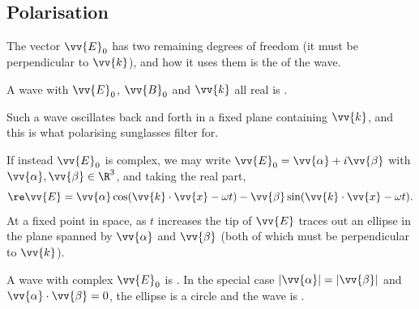 \subsection{Polarisation}

The vector $\vv{E}_0$ has two remaining degrees of freedom (it must be perpendicular to $\vv{k}$), and how it uses them is the  of the wave.

\begin{definition}
	A wave with $\vv{E}_0$, $\vv{B}_0$ and $\vv{k}$ all real is .
\end{definition}

Such a wave oscillates back and forth in a fixed plane containing $\vv{k}$, and this is what polarising sunglasses filter for.

If instead $\vv{E}_0$ is complex, we may write $\vv{E}_0 = \vv{\alpha} + i \vv{\beta}$ with $\vv{\alpha}, \vv{\beta}\in \R^3$, and taking the real part,
$$
\re \vv{E} = \vv{\alpha}\cos(\vv{k}\cdot\vv{x}-\omega t) - \vv{\beta}\sin(\vv{k}\cdot \vv{x}-\omega t).
$$
At a fixed point in space, as $t$ increases the tip of $\vv{E}$ traces out an ellipse in the plane spanned by $\vv{\alpha}$ and $\vv{\beta}$ (both of which must be perpendicular to $\vv{k}$).

\begin{definition}
	A wave with complex $\vv{E}_0$ is . In the special case $|\vv{\alpha}| = |\vv{\beta}|$ and $\vv{\alpha}\cdot\vv{\beta} = 0$, the ellipse is a circle and the wave is .
\end{definition}

